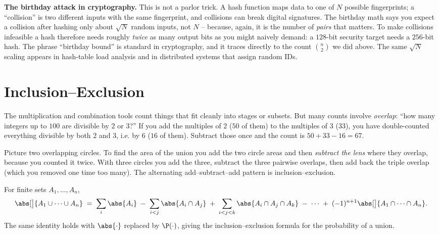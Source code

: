 \begin{applicationbox}
\textbf{The birthday attack in cryptography.} This is not a parlor trick. A hash function
maps data to one of $N$ possible fingerprints; a ``collision'' is two different inputs with
the same fingerprint, and collisions can break digital signatures. The birthday math says
you expect a collision after hashing only about $\sqrt{N}$ random inputs, not $N$ -- because,
again, it is the number of \emph{pairs} that matters. To make collisions infeasible a hash
therefore needs roughly \emph{twice} as many output bits as you might naively demand: a
$128$-bit security target needs a $256$-bit hash. The phrase ``birthday bound'' is standard
in cryptography, and it traces directly to the count $\binom{n}{2}$ we did above. The same
$\sqrt{N}$ scaling appears in hash-table load analysis and in distributed systems that
assign random IDs.
\end{applicationbox}

\section{Inclusion--Exclusion}
\label{ch2:incexc}

The multiplication and combination tools count things that fit cleanly into stages or
subsets. But many counts involve \emph{overlap}: ``how many integers up to $100$ are
divisible by $2$ or $3$?'' If you add the multiples of $2$ ($50$ of them) to the multiples
of $3$ ($33$), you have double-counted everything divisible by both $2$ and $3$, i.e. by
$6$ ($16$ of them). Subtract those once and the count is $50 + 33 - 16 = 67$.

\begin{intuitionbox}
Picture two overlapping circles. To find the area of the union you add the two circle areas
and then \emph{subtract the lens} where they overlap, because you counted it twice. With
three circles you add the three, subtract the three pairwise overlaps, then add back the
triple overlap (which you removed one time too many). The alternating add--subtract--add
pattern is inclusion--exclusion.
\end{intuitionbox}

\begin{theorem}
\label{ch2:thm-incexc}
For finite sets $A_1, \dots, A_n$,
\[
  \abs[\big]{A_1 \cup \cdots \cup A_n}
  \;=\; \sum_{i} \abs{A_i}
  \;-\; \sum_{i<j} \abs{A_i \cap A_j}
  \;+\; \sum_{i<j<k} \abs{A_i \cap A_j \cap A_k}
  \;-\; \cdots
  \;+\; (-1)^{n+1}\abs[\big]{A_1 \cap \cdots \cap A_n}.
\]
The same identity holds with $\abs{\cdot}$ replaced by $\P(\cdot)$, giving the
inclusion--exclusion formula for the probability of a union.
\end{theorem}

